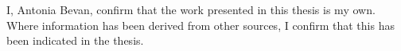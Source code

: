 \thispagestyle{empty}

\vspace*{3cm}

\begin{flushleft}
I, Antonia Bevan, confirm that the work presented in this thesis is my own. Where
information has been derived from other sources, I confirm that this has been indicated in
the thesis.
\end{flushleft}